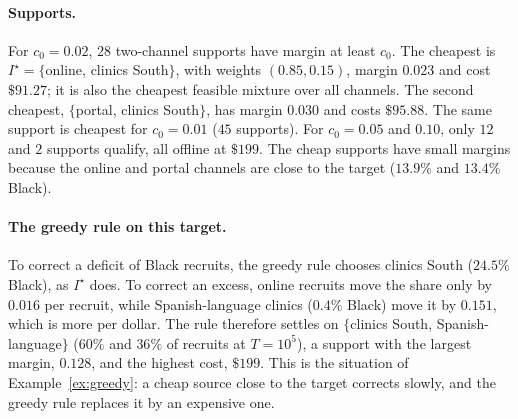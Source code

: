 \documentclass[twoside]{article}
\begin{document}
\paragraph{Supports.} For \(c_0=0.02\), \(28\) two-channel supports have
margin at least \(c_0\). The cheapest is \(I^\star=\{\)online, clinics
South\(\}\), with weights \((0.85,0.15)\), margin \(0.023\) and cost
\(\$91.27\); it is also the cheapest feasible mixture over all channels.
The second cheapest, \(\{\)portal, clinics South\(\}\), has margin \(0.030\)
and costs \(\$95.88\). The same support is cheapest for \(c_0=0.01\)
(\(45\) supports). For \(c_0=0.05\) and \(0.10\), only \(12\) and \(2\)
supports qualify, all offline at \(\$199\). The cheap supports have small
margins because the online and portal channels are close to the target
(\(13.9\%\) and \(13.4\%\) Black).

\paragraph{The greedy rule on this target.} To correct a deficit of Black
recruits, the greedy rule chooses clinics South (\(24.5\%\) Black), as
\(I^\star\) does. To correct an excess, online recruits move the share only
by \(0.016\) per recruit, while Spanish-language clinics (\(0.4\%\) Black)
move it by \(0.151\), which is more per dollar. The rule therefore settles
on \(\{\)clinics South, Spanish-language\(\}\) (\(60\%\) and \(36\%\) of
recruits at \(T=10^5\)), a support with the largest margin, \(0.128\), and
the highest cost, \(\$199\). This is the situation of
Example~\ref{ex:greedy}: a cheap source close to the target corrects slowly,
and the greedy rule replaces it by an expensive one.
\end{document}
